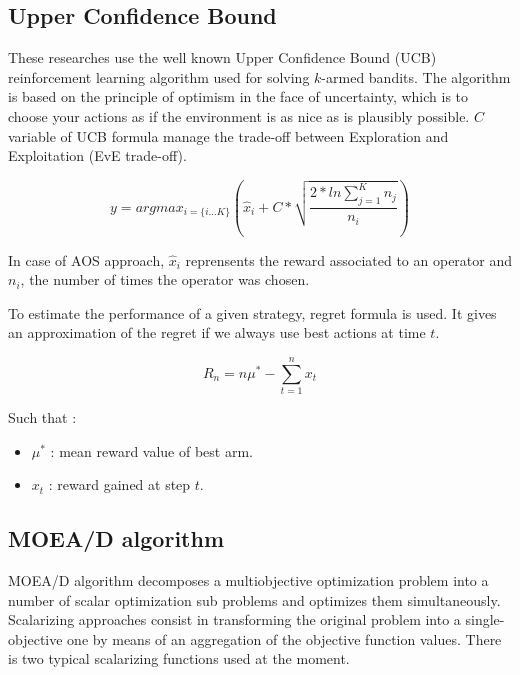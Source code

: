 \documentclass{article}
\begin{document}
    \subsection{Upper Confidence Bound}

    These researches use the well known  Upper Confidence Bound (UCB) reinforcement learning algorithm \citep{DBLP:journals/ml/AuerCF02} used for solving $k$-armed bandits. The algorithm is based on the principle of optimism in the face of uncertainty, which is to choose your actions as if the environment is as nice as is plausibly possible. $C$ variable of UCB formula manage the trade-off between Exploration and Exploitation (EvE trade-off).

    \begin{equation} \label{eq:UCB} \tag{UCB}
    y = argmax_{i=\{i...K\}} \left( \hat{x}_{i} + C * \sqrt{\frac{2 * ln\sum_{j=1}^{K} n_{j}}{n_{i}}} \right)
    \end{equation}

    In case of AOS approach, $\hat{x}_i$ reprensents the reward associated to an operator and $n_i$, the number of times the operator was chosen.

    \vspace{3mm}
    To estimate the performance of a given strategy, regret formula is used. It gives an approximation of the regret if we always use best actions at time $t$.

    \begin{equation} \label{eq:Regret} \tag{Regret}
    R_n = n\mu^* - \sum_{t=1}^{n} x_t
    \end{equation}

    Such that :
    \begin{itemize}
        \item $\mu^*$ : mean reward value of best arm.
        \item $x_t$ : reward gained at step $t$.
    \end{itemize}

    \subsection{MOEA/D algorithm}

    MOEA/D \citep{DBLP:journals/tec/ZhangL07} algorithm decomposes a multiobjective optimization problem into a number of scalar optimization sub problems and optimizes them simultaneously. Scalarizing approaches consist in transforming the original problem into a single-objective one by means of an aggregation of the objective function values. There is two typical scalarizing functions used at the moment.
\end{document}
